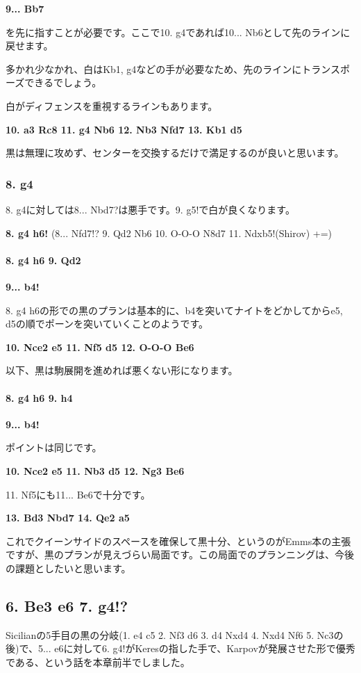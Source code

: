 {\bf 9... Bb7}

を先に指すことが必要です。ここで10. g4であれば10... Nb6として先のラインに戻せます。

多かれ少なかれ、白はKb1, g4などの手が必要なため、先のラインにトランスポーズできるでしょう。

白がディフェンスを重視するラインもあります。

{\bf 10. a3 Rc8 11. g4 Nb6 12. Nb3 Nfd7 13. Kb1 d5}

黒は無理に攻めず、センターを交換するだけで満足するのが良いと思います。

\subsubsection{8. g4}

8. g4に対しては8... Nbd7?は悪手です。9. g5!で白が良くなります。

{\bf 8. g4 h6!} (8... Nfd7!? 9. Qd2 Nb6 10. O-O-O N8d7 11. Ndxb5!(Shirov) +=)

\paragraph{8. g4 h6 9. Qd2}
\mbox{}\newline

{\bf 9... b4!}

8. g4 h6の形での黒のプランは基本的に、b4を突いてナイトをどかしてからe5, d5の順でポーンを突いていくことのようです。

{\bf 10. Nce2 e5 11. Nf5 d5 12. O-O-O Be6}

以下、黒は駒展開を進めれば悪くない形になります。


\paragraph{8. g4 h6 9. h4}
\mbox{}\newline

{\bf 9... b4!}

ポイントは同じです。

{\bf 10. Nce2 e5 11. Nb3 d5 12. Ng3 Be6}

11. Nf5にも11... Be6で十分です。

{\bf 13. Bd3 Nbd7 14. Qe2 a5}

これでクイーンサイドのスペースを確保して黒十分、というのがEmms本の主張ですが、黒のプランが見えづらい局面です。この局面でのプランニングは、今後の課題としたいと思います。

\subsection{6. Be3 e6 7. g4!?}
Sicilianの5手目の黒の分岐(1. e4 c5 2. Nf3 d6 3. d4 Nxd4 4. Nxd4 Nf6 5. Nc3の後)で、5... e6に対して6. g4!がKeresの指した手で、Karpovが発展させた形で優秀である、という話を本章前半でしました。

